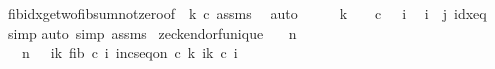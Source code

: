 \begin{isabellebody}
\ fib{\isacharunderscore}{\kern0pt}idx{\isacharunderscore}{\kern0pt}ge{\isacharunderscore}{\kern0pt}two{\isacharunderscore}{\kern0pt}fib{\isacharunderscore}{\kern0pt}sum{\isacharunderscore}{\kern0pt}not{\isacharunderscore}{\kern0pt}zero{\isacharbrackleft}{\kern0pt}of\ {}\ {\isachardoublequoteopen}k{\isacharminus}{\kern0pt}{}{\isachardoublequoteclose}\ c{\isacharbrackright}{\kern0pt}\ assms\ \isamarkupfalse%
\ auto\isanewline
\ \ \isamarkupfalse%
\ \isamarkupfalse%
\ {\isachardoublequoteopen}k\ {\isacharequal}{\kern0pt}\ {}\ {\isasymand}\ c\ {}\ {\isacharequal}{\kern0pt}\ i{\isachardoublequoteclose}\ \isamarkupfalse%
\ {\isacartoucheopen}i\ {\isacharequal}{\kern0pt}\ j{\isacartoucheclose}\ idx{\isacharunderscore}{\kern0pt}eq\ \isamarkupfalse%
\ simp\isanewline
{}\isamarkupfalse%
{\isacharparenleft}{\kern0pt}auto\ simp{\isacharcolon}{\kern0pt}\ assms{\isacharparenright}{\kern0pt}%
\endisatagproof
{\isafoldproof}%
%
\isadelimproof
\isanewline
%
\endisadelimproof
\isanewline
{}\isamarkupfalse%
\ zeckendorf{\isacharunderscore}{\kern0pt}unique{\isacharcolon}{\kern0pt}\isanewline
\ \ \ {\isachardoublequoteopen}n\ {\isachargreater}{\kern0pt}\ {}{\isachardoublequoteclose}\isanewline
\ \ \ {\isachardoublequoteopen}n\ {\isacharequal}{\kern0pt}\ {\isacharparenleft}{\kern0pt}{\isasymSum}\ i{\isacharequal}{\kern0pt}{}{\isachardot}{\kern0pt}{\isachardot}{\kern0pt}k{\isachardot}{\kern0pt}\ fib\ {\isacharparenleft}{\kern0pt}c\ i{\isacharparenright}{\kern0pt}{\isacharparenright}{\kern0pt}{\isachardoublequoteclose}\ {\isachardoublequoteopen}inc{\isacharunderscore}{\kern0pt}seq{\isacharunderscore}{\kern0pt}on\ c\ {\isacharbraceleft}{\kern0pt}{}{\isachardot}{\kern0pt}{\isachardot}{\kern0pt}k{\isacharminus}{\kern0pt}{}{\isacharbraceright}{\kern0pt}{\isachardoublequoteclose}\ {\isachardoublequoteopen}{\isasymforall}i{\isasymin}{\isacharbraceleft}{\kern0pt}{}{\isachardot}{\kern0pt}{\isachardot}{\kern0pt}k{\isacharbraceright}{\kern0pt}{\isachardot}{\kern0pt}\ c\ i\ {\isasymge}\ {}{\isachardoublequoteclose}\ \isanewline

\end{isabellebody}
